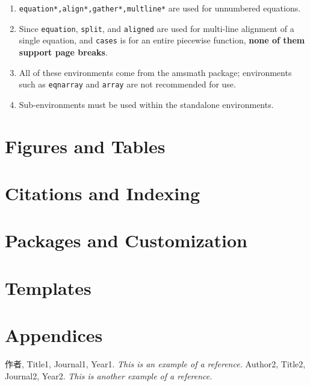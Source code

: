 \documentclass[11pt]{elegantbook}
\begin{document}
\begin{note}
    \begin{enumerate}
        \item \lstinline|equation*,align*,gather*,multline*| are used for unnumbered equations.
        \item Since \lstinline|equation|, \lstinline|split|, and \lstinline|aligned| are used for multi-line alignment of a single equation, 
        and \lstinline|cases| is for an entire piecewise function, \textbf{none of them support page breaks}.
        \item All of these environments come from the amsmath package; 
        environments such as \lstinline|eqnarray| and \lstinline|array| are not recommended for use.
        \item Sub-environments must be used within the standalone environments.
    \end{enumerate}
\end{note}



\chapter{Figures and Tables}

\chapter{Citations and Indexing}

\chapter{Packages and Customization}

\chapter{Templates}

\chapter{Appendices}

\begin{thebibliography}{99} 
 作者, Title1, Journal1, Year1. \emph{ This is an example of a reference.}
 Author2, Title2, Journal2, Year2. \emph{ This is another example of a reference.}
\end{thebibliography}
\end{document}

